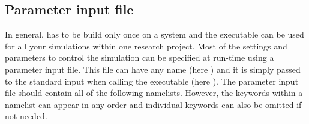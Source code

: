 \documentclass[a4paper, 11pt, DIV=11]{scrartcl}
\begin{document}
\subsection{Parameter input file}
\label{sec:parameterInputFile}

In general, \nsc has to be build only once on a system and the executable
can be used for all your simulations within one research project. Most of
the settings and parameters to control the simulation can be specified at
run-time using a parameter input file. This file can have any name (here
) and it is simply passed to the standard input when
calling the executable (here ). The parameter input
file should contain all of the following \fortran namelists. However, the
keywords within a namelist can appear in any order and individual keywords
can also be omitted if not needed.
\end{document}

